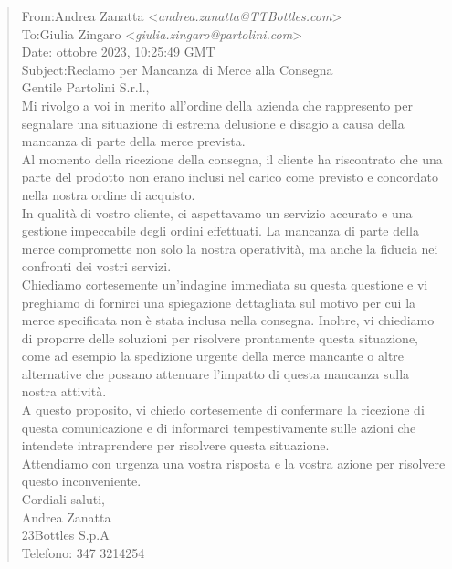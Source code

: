 \footnotesize
\begin{tcolorbox}[colback=gray!20, colframe=gray!50,sharp corners=southwest]
\begin{quote}
From:\qquad Andrea Zanatta <\textit{andrea.zanatta@TTBottles.com}>\\
To:\qquad Giulia Zingaro <\textit{giulia.zingaro@partolini.com}>\\
Date: ottobre 2023, 10:25:49 GMT\\
Subject:\qquad Reclamo per Mancanza di Merce alla Consegna\vspace{14pt}\\
Gentile Partolini S.r.l.,\vspace{14pt}\\
Mi rivolgo a voi in merito all'ordine della azienda che rappresento per segnalare una situazione di estrema delusione e disagio a causa della mancanza di parte della merce prevista.\vspace{14pt}\\
Al momento della ricezione della consegna, il cliente ha riscontrato che una parte del prodotto non erano inclusi nel carico come previsto e concordato nella nostra ordine di acquisto.\vspace{14pt}\\
In qualità di vostro cliente, ci aspettavamo un servizio accurato e una gestione impeccabile degli ordini effettuati. La mancanza di parte della merce compromette non solo la nostra operatività, ma anche la fiducia nei confronti dei vostri servizi.\vspace{14pt}\\
Chiediamo cortesemente un'indagine immediata su questa questione e vi preghiamo di fornirci una spiegazione dettagliata sul motivo per cui la merce specificata non è stata inclusa nella consegna. Inoltre, vi chiediamo di proporre delle soluzioni per risolvere prontamente questa situazione, come ad esempio la spedizione urgente della merce mancante o altre alternative che possano attenuare l'impatto di questa mancanza sulla nostra attività.\vspace{14pt}\\
A questo proposito, vi chiedo cortesemente di confermare la ricezione di questa comunicazione e di informarci tempestivamente sulle azioni che intendete intraprendere per risolvere questa situazione.\vspace{14pt}\\
Attendiamo con urgenza una vostra risposta e la vostra azione per risolvere questo inconveniente.\vspace{14pt}\\
Cordiali saluti,\\
Andrea Zanatta\\
23Bottles S.p.A\\
Telefono: 347 3214254
\end{quote}
\end{tcolorbox}
